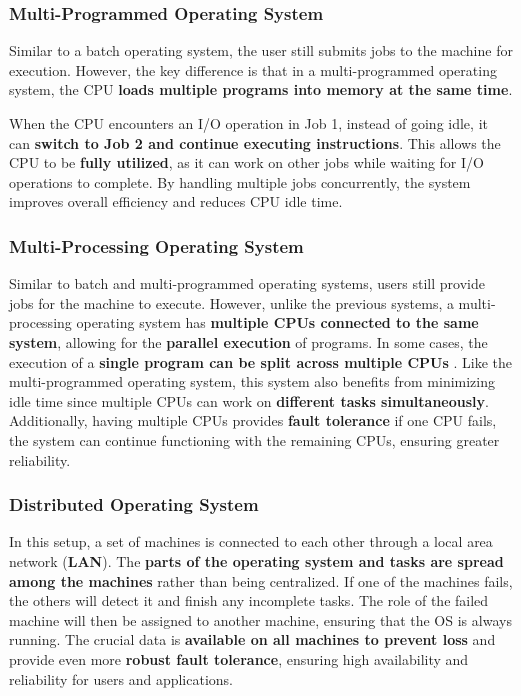 \subsubsection{Multi-Programmed Operating System}
Similar to a batch operating system, the user still submits jobs to the machine for execution. However, the key difference is that in a multi-programmed 
operating system, the CPU \textbf{loads multiple programs into memory at the same time}.

When the CPU encounters an I/O operation in Job 1, instead of going idle, it can \textbf{switch to Job 2 and continue executing instructions}. 
This allows the CPU to be \textbf{fully utilized}, as it can work on other jobs while waiting for I/O operations to complete. 
By handling multiple jobs concurrently, the system improves overall efficiency and reduces CPU idle time.
\subsubsection{Multi-Processing Operating System}
Similar to batch and multi-programmed operating systems, users still provide jobs for the machine to execute. However, unlike the previous systems, a 
multi-processing operating system has \textbf{multiple CPUs connected to the same system}, allowing for the \textbf{parallel execution} of programs. In some cases, 
the execution of a  \textbf{single program can be split across multiple CPUs} .
Like the multi-programmed operating system, this system also benefits from minimizing idle time since multiple CPUs can work on \textbf{different tasks simultaneously}. 
Additionally, having multiple CPUs provides  \textbf{fault tolerance} if one CPU fails, the system can continue functioning with the remaining CPUs, ensuring greater reliability.
\subsubsection{Distributed Operating System}
In this setup, a set of machines is connected to each other through a local area network (\textbf{LAN}). The  \textbf{parts of the operating system and tasks are spread among the machines }
rather than being centralized. If one of the machines fails, the others will detect it and finish any incomplete tasks. The role of the failed machine will then be assigned to 
another machine, ensuring that the OS is always running. The crucial data is  \textbf{available on all machines to prevent loss} and provide even more  \textbf{robust fault tolerance}, ensuring high 
availability and reliability for users and applications.
